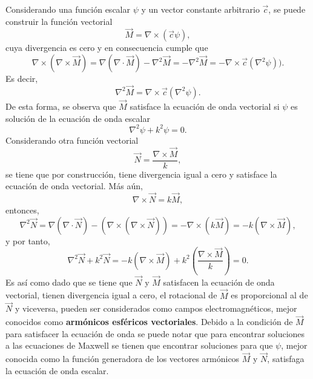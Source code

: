 Considerando una función escalar $\psi$ y un vector constante arbitrario $\Vec{c}$, se puede construir la función vectorial
\begin{equation}
    \Vec{M}=\nabla\times(\Vec{c}\psi),
    \label{M}
\end{equation}
cuya divergencia es cero y en consecuencia cumple que
\begin{equation*}    
	\nabla\times(\nabla\times \Vec{M})=\nabla(\nabla\cdot \Vec{M})-\nabla^2\Vec{M}=-\nabla^2\Vec{M}= -\nabla\times\Vec{c}(\nabla^2\psi)).
\end{equation*}
Es decir,
\begin{equation*}   
	\nabla^2\Vec{M}=\nabla\times\Vec{c}(\nabla^2\psi).
\end{equation*}
De esta forma, se observa que $\Vec{M}$ satisface la ecuación de onda vectorial si $\psi$ es solución de la ecuación de onda escalar
\begin{equation*}   
	\nabla^2\psi+k^2\psi=0.
\end{equation*}
Considerando otra función vectorial
\begin{equation}
	\Vec{N}=\frac{\nabla\times\Vec{M}}{k},	
\end{equation}
se tiene que por construcción, tiene divergencia igual a cero y satisface la ecuación de onda vectorial. Más aún, 
\begin{equation}
	\nabla\times\Vec{N}=k\Vec{M},
\end{equation}
entonces, 
$$\nabla^2\Vec{N}=\nabla(\nabla\cdot\Vec{N})-(\nabla\times(\nabla\times\Vec{N}))=-\nabla\times(k\Vec{M})=-k(\nabla\times\Vec{M}),$$
y por tanto, 
$$\nabla^2\Vec{N}+k^2\Vec{N}=-k(\nabla\times\Vec{M})+k^2\left(\frac{\nabla\times\Vec{M}}{k}\right)=0.$$
Es así como dado que se tiene que $\Vec{N}$ y $\Vec{M}$ satisfacen la ecuación de onda vectorial, tienen divergencia igual a cero, el rotacional de $\Vec{M}$ es proporcional al de $\Vec{N}$ y viceversa,  pueden ser considerados como campos electromagnéticos, mejor conocidos como \textbf{armónicos esféricos vectoriales}. Debido a la condición de $\Vec{M}$ para satisfacer la ecuación de onda se puede notar que para encontrar soluciones a las ecuaciones de Maxwell se tienen que encontrar soluciones para que $\psi$, mejor conocida como la función generadora de los vectores armónicos $\Vec{M}$ y $\Vec{N}$, satisfaga la ecuación de onda escalar.\\

